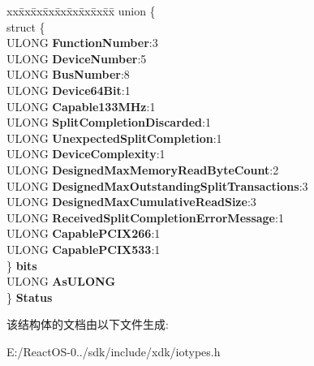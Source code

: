 \begin{DoxyCompactItemize}
\begin{tabbing}
\end{tabbing}\item 
\mbox{\label{struct_p_c_i___x___c_a_p_a_b_i_l_i_t_y_abc878ee7a1b0da7353497906dab9cd62}} 
\begin{tabbing}
xx\=xx\=xx\=xx\=xx\=xx\=xx\=xx\=xx\=\kill
union \{\\
\>struct \{\\
\>\>ULONG {\bfseries FunctionNumber}:3\\
\>\>ULONG {\bfseries DeviceNumber}:5\\
\>\>ULONG {\bfseries BusNumber}:8\\
\>\>ULONG {\bfseries Device64Bit}:1\\
\>\>ULONG {\bfseries Capable133MHz}:1\\
\>\>ULONG {\bfseries SplitCompletionDiscarded}:1\\
\>\>ULONG {\bfseries UnexpectedSplitCompletion}:1\\
\>\>ULONG {\bfseries DeviceComplexity}:1\\
\>\>ULONG {\bfseries DesignedMaxMemoryReadByteCount}:2\\
\>\>ULONG {\bfseries DesignedMaxOutstandingSplitTransactions}:3\\
\>\>ULONG {\bfseries DesignedMaxCumulativeReadSize}:3\\
\>\>ULONG {\bfseries ReceivedSplitCompletionErrorMessage}:1\\
\>\>ULONG {\bfseries CapablePCIX266}:1\\
\>\>ULONG {\bfseries CapablePCIX533}:1\\
\>\} {\bfseries bits}\\
\>ULONG {\bfseries AsULONG}\\
\} {\bfseries Status}\\

\end{tabbing}\end{DoxyCompactItemize}


该结构体的文档由以下文件生成\+:\begin{DoxyCompactItemize}
\item 
E\+:/\+React\+O\+S-\/0../sdk/include/xdk/iotypes.\+h\end{DoxyCompactItemize}
